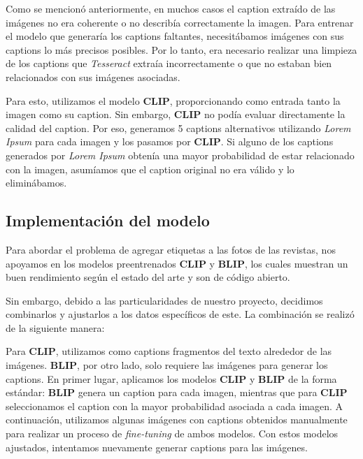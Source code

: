 \documentclass[14pt]{extarticle}
\begin{document}
Como se mencionó anteriormente, en muchos casos el caption extraído de las imágenes no era coherente o no describía correctamente la imagen. Para entrenar el modelo que generaría los captions faltantes, necesitábamos imágenes con sus captions lo más precisos posibles. Por lo tanto, era necesario realizar una limpieza de los captions que \textit{Tesseract} extraía incorrectamente o que no estaban bien relacionados con sus imágenes asociadas.

Para esto, utilizamos el modelo \textbf{CLIP}, proporcionando como entrada tanto la imagen como su caption. Sin embargo, \textbf{CLIP} no podía evaluar directamente la calidad del caption. Por eso, generamos 5 captions alternativos utilizando \textit{Lorem Ipsum} para cada imagen y los pasamos por \textbf{CLIP}. Si alguno de los captions generados por \textit{Lorem Ipsum} obtenía una mayor probabilidad de estar relacionado con la imagen, asumíamos que el caption original no era válido y lo eliminábamos.

\subsection{Implementación del modelo}

Para abordar el problema de agregar etiquetas a las fotos de las revistas, nos apoyamos en los modelos preentrenados \textbf{CLIP} y \textbf{BLIP}, los cuales muestran un buen rendimiento según el estado del arte y son de código abierto.

Sin embargo, debido a las particularidades de nuestro proyecto, decidimos combinarlos y ajustarlos a los datos específicos de este. La combinación se realizó de la siguiente manera:

Para \textbf{CLIP}, utilizamos como captions fragmentos del texto alrededor de las imágenes. \textbf{BLIP}, por otro lado, solo requiere las imágenes para generar los captions.
En primer lugar, aplicamos los modelos \textbf{CLIP} y \textbf{BLIP} de la forma estándar: \textbf{BLIP} genera un caption para cada imagen, mientras que para \textbf{CLIP} seleccionamos el caption con la mayor probabilidad asociada a cada imagen. A continuación, utilizamos algunas imágenes con captions obtenidos manualmente para realizar un proceso de \textit{fine-tuning} de ambos modelos. Con estos modelos ajustados, intentamos nuevamente generar captions para las imágenes.
\end{document}
